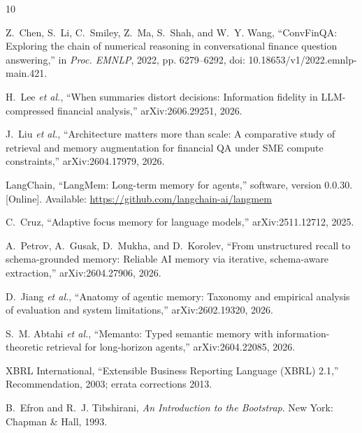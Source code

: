 \documentclass[conference,a4paper]{IEEEtran}
\begin{document}
\clearpage
\begin{thebibliography}{10}

Z.~Chen, S.~Li, C.~Smiley, Z.~Ma, S.~Shah, and W.~Y. Wang, ``ConvFinQA: Exploring the chain of numerical reasoning in conversational finance question answering,'' in \emph{Proc. EMNLP}, 2022, pp. 6279--6292, doi: 10.18653/v1/2022.emnlp-main.421.

H.~Lee \emph{et al.}, ``When summaries distort decisions: Information fidelity in LLM-compressed financial analysis,'' arXiv:2606.29251, 2026.

J.~Liu \emph{et al.}, ``Architecture matters more than scale: A comparative study of retrieval and memory augmentation for financial QA under SME compute constraints,'' arXiv:2604.17979, 2026.

LangChain, ``LangMem: Long-term memory for agents,'' software, version 0.0.30. [Online]. Available: \url{https://github.com/langchain-ai/langmem}

C.~Cruz, ``Adaptive focus memory for language models,'' arXiv:2511.12712, 2025.

A.~Petrov, A.~Gusak, D.~Mukha, and D.~Korolev, ``From unstructured recall to schema-grounded memory: Reliable AI memory via iterative, schema-aware extraction,'' arXiv:2604.27906, 2026.

D.~Jiang \emph{et al.}, ``Anatomy of agentic memory: Taxonomy and empirical analysis of evaluation and system limitations,'' arXiv:2602.19320, 2026.

S.~M. Abtahi \emph{et al.}, ``Memanto: Typed semantic memory with information-theoretic retrieval for long-horizon agents,'' arXiv:2604.22085, 2026.

XBRL International, ``Extensible Business Reporting Language (XBRL) 2.1,'' Recommendation, 2003; errata corrections 2013.

B.~Efron and R.~J. Tibshirani, \emph{An Introduction to the Bootstrap}. New York: Chapman \& Hall, 1993.

\end{thebibliography}
\end{document}
